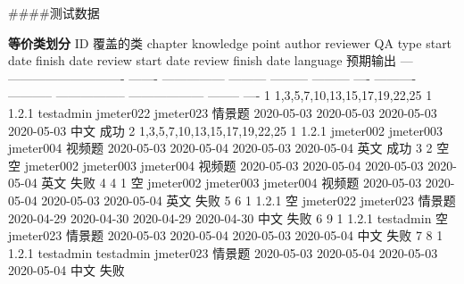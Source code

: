 \documentclass[hyperref, a4paper]{ctexart}
\begin{document}
\#\#\#\#测试数据

\textbf{等价类划分} \textbar{} ID \textbar{} 覆盖的类 \textbar{} chapter
\textbar{} knowledge point \textbar{} author \textbar{} reviewer
\textbar{} QA \textbar{} type \textbar{} start date \textbar{} finish
date \textbar{} review start date \textbar{} review finish date
\textbar{} language \textbar{} 预期输出 \textbar{} \textbar{} ---
\textbar{} ---------------------------- \textbar{} ------- \textbar{}
--------------- \textbar{} --------- \textbar{} --------- \textbar{}
--------- \textbar{} ---- \textbar{} ---------- \textbar{} -----------
\textbar{} ----------------- \textbar{} ------------------ \textbar{}
-------- \textbar{} ---- \textbar{} \textbar{} 1 \textbar{}
1,3,5,7,10,13,15,17,19,22,25 \textbar{} 1 \textbar{} 1.2.1 \textbar{}
testadmin \textbar{} jmeter022 \textbar{} jmeter023 \textbar{} 情景题
\textbar{} 2020-05-03 \textbar{} 2020-05-03 \textbar{} 2020-05-03
\textbar{} 2020-05-03 \textbar{} 中文 \textbar{} 成功 \textbar{}
\textbar{} 2 \textbar{} 1,3,5,7,10,13,15,17,19,22,25 \textbar{} 1
\textbar{} 1.2.1 \textbar{} jmeter002 \textbar{} jmeter003 \textbar{}
jmeter004 \textbar{} 视频题 \textbar{} 2020-05-03 \textbar{} 2020-05-04
\textbar{} 2020-05-03 \textbar{} 2020-05-04 \textbar{} 英文 \textbar{}
成功 \textbar{} \textbar{} 3 \textbar{} 2 \textbar{} 空 \textbar{} 空
\textbar{} jmeter002 \textbar{} jmeter003 \textbar{} jmeter004
\textbar{} 视频题 \textbar{} 2020-05-03 \textbar{} 2020-05-04 \textbar{}
2020-05-03 \textbar{} 2020-05-04 \textbar{} 英文 \textbar{} 失败
\textbar{} \textbar{} 4 \textbar{} 4 \textbar{} 1 \textbar{} 空
\textbar{} jmeter002 \textbar{} jmeter003 \textbar{} jmeter004
\textbar{} 视频题 \textbar{} 2020-05-03 \textbar{} 2020-05-04 \textbar{}
2020-05-03 \textbar{} 2020-05-04 \textbar{} 英文 \textbar{} 失败
\textbar{} \textbar{} 5 \textbar{} 6 \textbar{} 1 \textbar{} 1.2.1
\textbar{} 空 \textbar{} jmeter022 \textbar{} jmeter023 \textbar{}
情景题 \textbar{} 2020-04-29 \textbar{} 2020-04-30 \textbar{} 2020-04-29
\textbar{} 2020-04-30 \textbar{} 中文 \textbar{} 失败 \textbar{}
\textbar{} 6 \textbar{} 9 \textbar{} 1 \textbar{} 1.2.1 \textbar{}
testadmin \textbar{} 空 \textbar{} jmeter023 \textbar{} 情景题
\textbar{} 2020-05-03 \textbar{} 2020-05-04 \textbar{} 2020-05-03
\textbar{} 2020-05-04 \textbar{} 中文 \textbar{} 失败 \textbar{}
\textbar{} 7 \textbar{} 8 \textbar{} 1 \textbar{} 1.2.1 \textbar{}
testadmin \textbar{} testadmin \textbar{} jmeter023 \textbar{} 情景题
\textbar{} 2020-05-03 \textbar{} 2020-05-04 \textbar{} 2020-05-03
\textbar{} 2020-05-04 \textbar{} 中文 \textbar{} 失败 \textbar{}
\end{document}
